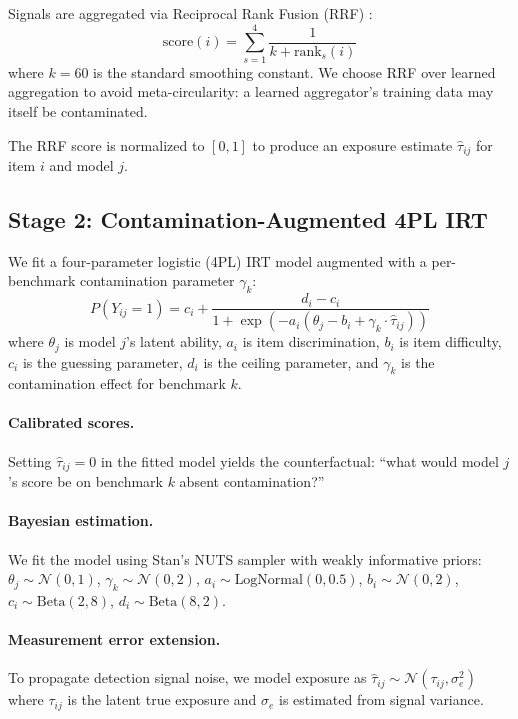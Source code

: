 \documentclass[11pt,a4paper]{article}
\begin{document}
Signals are aggregated via Reciprocal Rank Fusion (RRF) \cite{cormack2009reciprocal}:
\begin{equation}
\text{score}(i) = \sum_{s=1}^{4} \frac{1}{k + \text{rank}_s(i)}
\end{equation}
where $k=60$ is the standard smoothing constant.
We choose RRF over learned aggregation to avoid meta-circularity: a learned aggregator's training data may itself be contaminated.

The RRF score is normalized to $[0,1]$ to produce an exposure estimate $\hat{\tau}_{ij}$ for item $i$ and model $j$.

\subsection{Stage 2: Contamination-Augmented 4PL IRT}

We fit a four-parameter logistic (4PL) IRT model augmented with a per-benchmark contamination parameter $\gamma_k$:
\begin{equation}
P(Y_{ij}=1) = c_i + \frac{d_i - c_i}{1 + \exp(-a_i(\theta_j - b_i + \gamma_k \cdot \hat{\tau}_{ij}))}
\end{equation}
where $\theta_j$ is model $j$'s latent ability, $a_i$ is item discrimination, $b_i$ is item difficulty, $c_i$ is the guessing parameter, $d_i$ is the ceiling parameter, and $\gamma_k$ is the contamination effect for benchmark $k$.

\paragraph{Calibrated scores.}
Setting $\hat{\tau}_{ij}=0$ in the fitted model yields the counterfactual: ``what would model $j$'s score be on benchmark $k$ absent contamination?''

\paragraph{Bayesian estimation.}
We fit the model using Stan's NUTS sampler \cite{carpenter2017stan} with weakly informative priors: $\theta_j \sim \mathcal{N}(0,1)$, $\gamma_k \sim \mathcal{N}(0,2)$, $a_i \sim \text{LogNormal}(0,0.5)$, $b_i \sim \mathcal{N}(0,2)$, $c_i \sim \text{Beta}(2,8)$, $d_i \sim \text{Beta}(8,2)$.

\paragraph{Measurement error extension.}
To propagate detection signal noise, we model exposure as $\hat{\tau}_{ij} \sim \mathcal{N}(\tau_{ij}, \sigma_e^2)$ where $\tau_{ij}$ is the latent true exposure and $\sigma_e$ is estimated from signal variance.
\end{document}
